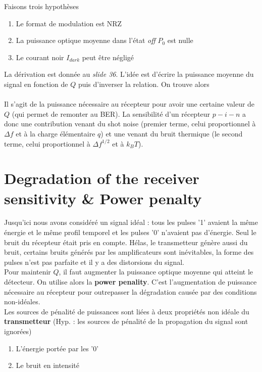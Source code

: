 Faisons trois hypothèses
\begin{enumerate}
\item Le format de modulation est NRZ
\item La puissance optique moyenne dans l'état \textit{off} $P_0$ est nulle
\item Le courant noir $I_{dark}$ peut être négligé
\end{enumerate}
La dérivation est donnée au \textit{slide 36}. L'idée est d'écrire la puissance moyenne du signal
en fonction de $Q$ puis d'inverser la relation. On trouve alors\\

\ \\

Il s'agit de la puissance nécessaire au récepteur pour avoir une certaine valeur de $Q$ (qui permet
de remonter au BER). La sensibilité d'un récepteur $p-i-n$ a donc une contribution venant du 
shot noise (premier terme, celui proportionnel à $\Delta f$ et à la charge élémentaire $q$) et une venant du bruit thermique (le second terme, celui proportionnel à $\Delta f^{1/2}$ et à $k_BT$).
\newpage
\section{Degradation of the receiver sensitivity \& Power penalty}
Jusqu'ici nous avons considéré un signal idéal : tous les pulses '1' avaient la même énergie et le
même profil temporel et les pulses '0' n'avaient pas d'énergie. Seul le bruit du récepteur était
pris en compte. Hélas, le transmetteur génère aussi du bruit, certains bruits générés par les
amplificateurs sont inévitables, la forme des pulses n'est pas parfaite et il y a des distorsions
du signal.\\

Pour maintenir $Q$, il faut augmenter la puissance optique moyenne qui atteint le détecteur. On 
utilise alors la \textbf{power penality}. C'est l'augmentation de puissance nécessaire au récepteur
pour outrepasser la dégradation causée par des conditions non-idéales.\\

Les sources de pénalité de puissances sont liées à deux propriétés non idéale du 
\textbf{transmetteur} (Hyp. : les sources de pénalité de la propagation du signal sont ignorées)
\begin{enumerate}
\item L'énergie portée par les '0'
\item Le bruit en intensité
\end{enumerate}

